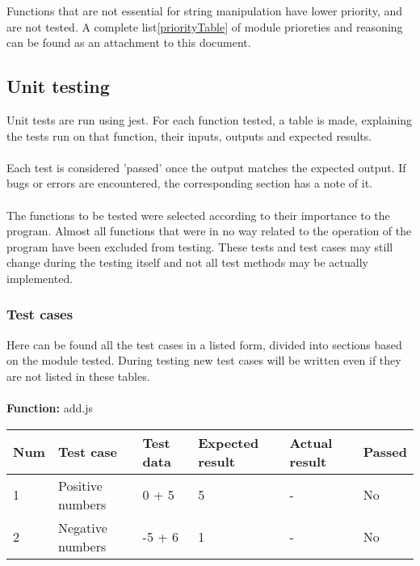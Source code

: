 \documentclass[a4paper, 12pt]{article}
\begin{document}
Functions that are not essential for string manipulation have lower priority, and are not tested.
A complete list\ref{priorityTable} of module prioreties and reasoning can be found as an attachment to this document.


    \subsection{Unit testing}
    Unit tests are run using jest. For each function tested, a table is made, explaining the tests run on that function,
    their inputs, outputs and expected results. 
    \\\\
    Each test is considered 'passed' once the output matches the expected output. 
    If bugs or errors are encountered, the corresponding section has a note of it.
    \\\\
    The functions to be tested were selected according to their importance to the program. Almost all functions that were in no way related to the operation of the program have been excluded from testing. These tests and test cases may still change during the testing itself and not all test methods may be actually implemented. 
    \newpage

        \subsubsection{Test cases}
        Here can be found all the test cases in a listed form, divided into sections based on the module tested. During testing new test cases will be written even if they are not listed in these tables. 
        \\
        \\
        \textbf{Function:} add.js
	
        \begin{table}[h!]
           \begin{tabular}{|l|p{3cm}|p{2cm}|p{2cm}|p{2.5cm}|l|}
                \hline
                Num & Test case        					& Test data 					& Expected result 					& Actual result 		& Passed \\ \hline
                1   & Positive numbers 					& 0 + 5     					& 5               					& -             		& No     \\ \hline
                2   & Negative numbers 					& -5 + 6    					& 1               					& -             		& No     \\ \hline
            \end{tabular}
        \end{table}
    
\end{document}
